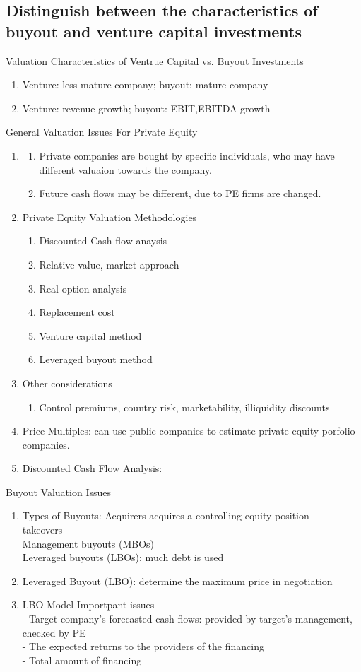 \documentclass{article}
\newcommand{\be}{\begin{enumerate}}
\newcommand{\ee}{\end{enumerate}}
\begin{document}
\subsection{Distinguish between the characteristics of buyout and venture capital investments}
Valuation Characteristics of Ventrue Capital vs. Buyout Investments
\be
    \item Venture: less mature company; buyout: mature company
    \item Venture: revenue growth; buyout: EBIT,EBITDA growth
\ee
General Valuation Issues For Private Equity
\be
    \item 
    \be
        \item Private companies are bought by specific individuals, who may have different valuaion towards the company.
        \item Future cash flows may be different, due to PE firms are changed.
    \ee
    \item 
    Private Equity Valuation Methodologies
    \be
        \item Discounted Cash flow anaysis
        \item Relative value, market approach
        \item Real option analysis
        \item Replacement cost
        \item Venture capital method
        \item Leveraged buyout method
    \ee
    \item 
    Other considerations
    \be
        \item Control premiums, country risk, marketability, illiquidity discounts
    \ee
    \item 
    Price Multiples: can use public companies to estimate private equity porfolio companies.
    \item Discounted Cash Flow Analysis: 
\ee
Buyout Valuation Issues
\be
    \item Types of Buyouts: Acquirers acquires a controlling equity position
    \\takeovers
    \\Management buyouts (MBOs)
    \\Leveraged buyouts (LBOs): much debt is used
    \item Leveraged Buyout (LBO): determine the maximum price in negotiation
    \item LBO Model Importpant issues
        \\ - Target company's forecasted cash flows: provided by target's management, checked by PE
        \\ - The expected returns to the providers of the financing
        \\ - Total amount of financing
\ee
\end{document}
